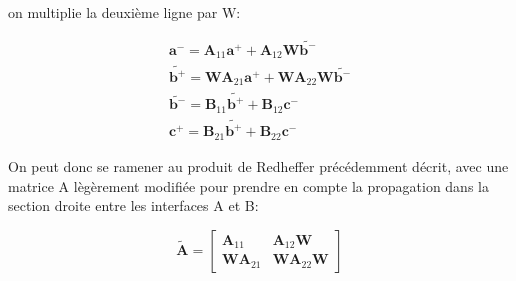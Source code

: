 \documentclass[12pt,a4paper]{report}
\begin{document}
on multiplie la deuxième ligne par W:

\begin{align}
    \mathbf{a}^- = \mathbf{A}_{11} \mathbf{a}^+ + \mathbf{A}_{12} \mathbf{W} \widetilde{\mathbf{b^-}} \\
    \widetilde{\mathbf{b}^+} = \mathbf{W} \mathbf{A}_{21} \mathbf{a}^+ + \mathbf{W} \mathbf{A}_{22} \mathbf{W} \widetilde{\mathbf{b^-}} \\
    \widetilde{\mathbf{b}^-} = \mathbf{B}_{11} \widetilde{\mathbf{b}^+} + \mathbf{B}_{12} \mathbf{c}^- \\
    \mathbf{c}^+ = \mathbf{B}_{21} \widetilde{\mathbf{b}^+} + \mathbf{B}_{22} \mathbf{c}^- 
\end{align}

On peut donc se ramener au produit de Redheffer précédemment décrit, avec une matrice A lègèrement modifiée pour prendre en compte la propagation dans la section droite
entre les interfaces A et B:

\begin{equation}
 \widetilde{\mathbf{A}} = \begin{bmatrix} \mathbf{A}_{11} & \mathbf{A}_{12} \mathbf{W} \\ \mathbf{W} \mathbf{A}_{21} & \mathbf{W} \mathbf{A}_{22} \mathbf{W} \end{bmatrix}
\end{equation}
\end{document}
